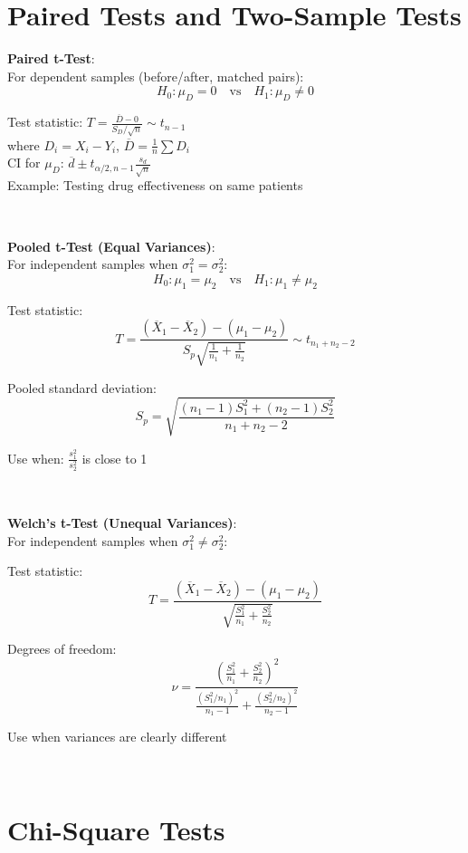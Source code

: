 \documentclass{article}
\newenvironment{cheatformula}[1][Title]{
    \begin{minipage}{\linewidth}
    \textbf{#1}:\\
}{
    \end{minipage}\\[2ex]
}
\begin{document}
\begin{multicols*}{2}
\section{Paired Tests and Two-Sample Tests}

\begin{cheatformula}[Paired t-Test]
    For dependent samples (before/after, matched pairs):
    $$H_0: \mu_D = 0 \quad \text{vs} \quad H_1: \mu_D \neq 0$$
    
    Test statistic: $T = \frac{\overline{D} - 0}{S_D/\sqrt{n}} \sim t_{n-1}$\\
    where $D_i = X_i - Y_i$, $\overline{D} = \frac{1}{n}\sum D_i$\\
    
    CI for $\mu_D$: $\overline{d} \pm t_{\alpha/2,n-1} \frac{s_d}{\sqrt{n}}$\\
    
    Example: Testing drug effectiveness on same patients
\end{cheatformula}

\begin{cheatformula}[Pooled t-Test (Equal Variances)]
    For independent samples when $\sigma_1^2 = \sigma_2^2$:
    $$H_0: \mu_1 = \mu_2 \quad \text{vs} \quad H_1: \mu_1 \neq \mu_2$$
    
    Test statistic: 
    $$T = \frac{(\overline{X}_1 - \overline{X}_2) - (\mu_1 - \mu_2)}{S_p\sqrt{\frac{1}{n_1} + \frac{1}{n_2}}} \sim t_{n_1+n_2-2}$$
    
    Pooled standard deviation:
    $$S_p = \sqrt{\frac{(n_1-1)S_1^2 + (n_2-1)S_2^2}{n_1+n_2-2}}$$
    
    Use when: $\frac{s_1^2}{s_2^2}$ is close to 1
\end{cheatformula}

\begin{cheatformula}[Welch's t-Test (Unequal Variances)]
    For independent samples when $\sigma_1^2 \neq \sigma_2^2$:
    
    Test statistic: 
    $$T = \frac{(\overline{X}_1 - \overline{X}_2) - (\mu_1 - \mu_2)}{\sqrt{\frac{S_1^2}{n_1} + \frac{S_2^2}{n_2}}}$$
    
    Degrees of freedom:
    $$\nu = \frac{\left(\frac{S_1^2}{n_1} + \frac{S_2^2}{n_2}\right)^2}{\frac{(S_1^2/n_1)^2}{n_1-1} + \frac{(S_2^2/n_2)^2}{n_2-1}}$$
    
    Use when variances are clearly different
\end{cheatformula}

\section{Chi-Square Tests}


\end{multicols*}
\end{document}

